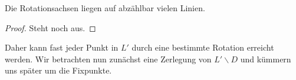 \begin{lemma} \label{lemma:abz_rot_achsen}
Die Rotationsachsen liegen auf abzählbar vielen Linien.
\end{lemma}
\begin{proof} 
Steht noch aus.
\end{proof}


Daher kann fast jeder Punkt in $L'$ durch eine bestimmte Rotation erreicht werden. Wir betrachten nun zunächst eine 
Zerlegung von $L'\backslash D$ und kümmern uns später um die Fixpunkte.






